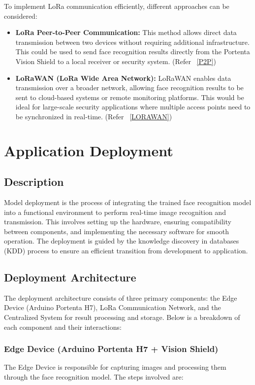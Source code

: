 To implement LoRa communication efficiently, different approaches can be considered:

\begin{itemize}
	\item \textbf{LoRa Peer-to-Peer Communication:} This method allows direct data transmission between two devices without requiring additional infrastructure. This could be used to send face recognition results directly from the Portenta Vision Shield to a local receiver or security system. (Refer ~\ref{P2P})
	
	\item \textbf{LoRaWAN (LoRa Wide Area Network):} LoRaWAN enables data transmission over a broader network, allowing face recognition results to be sent to cloud-based systems or remote monitoring platforms. This would be ideal for large-scale security applications where multiple access points need to be synchronized in real-time. (Refer ~\ref{LORAWAN})
\end{itemize}


\chapter{Application Deployment}

\section{Description}
Model deployment is the process of integrating the trained face recognition model into a functional environment to perform real-time image recognition and transmission. This involves setting up the hardware, ensuring compatibility between components, and implementing the necessary software for smooth operation. The deployment is guided by the knowledge discovery in databases (KDD) process to ensure an efficient transition from development to application. \cite{IEEE:1997}

\section{Deployment Architecture}

The deployment architecture consists of three primary components: the Edge Device (Arduino Portenta H7), LoRa Communication Network, and the Centralized System for result processing and storage. Below is a breakdown of each component and their interactions:

\subsection{Edge Device (Arduino Portenta H7 + Vision Shield)}
The Edge Device is responsible for capturing images and processing them through the face recognition model. The steps involved are:

